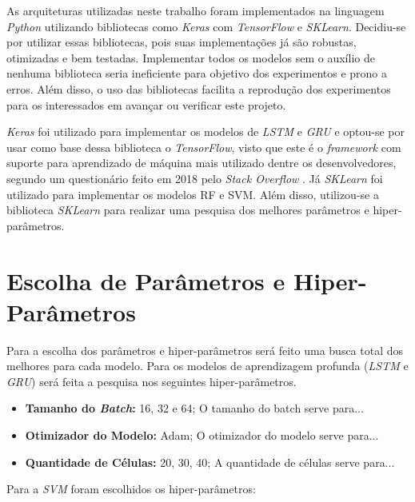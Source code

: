 As arquiteturas utilizadas neste trabalho foram implementados na linguagem \textit{Python} utilizando bibliotecas como \textit{Keras} com \textit{TensorFlow} e \textit{SKLearn}. Decidiu-se por utilizar essas bibliotecas, pois suas implementações já são robustas, otimizadas e bem testadas. Implementar todos os modelos sem o auxílio de nenhuma biblioteca seria ineficiente para objetivo dos experimentos e prono a erros. Além disso, o uso das bibliotecas facilita a reprodução dos experimentos para os interessados em avançar ou verificar este projeto.

\textit{Keras} foi utilizado para implementar os modelos de \textit{\acrshort{LSTM}} e \textit{\acrshort{GRU}} e optou-se por usar como base dessa biblioteca o \textit{TensorFlow}, visto que este é o \textit{framework} com suporte para aprendizado de máquina mais utilizado dentre os desenvolvedores, segundo um questionário feito em 2018 pelo \textit{Stack Overflow} \cite{stack_2018}. Já \textit{SKLearn} foi utilizado para implementar os modelos \acrshort{RF} e \acrshort{SVM}. Além disso, utilizou-se a biblioteca \textit {SKLearn} para realizar uma pesquisa dos melhores parâmetros e hiper-parâmetros.

\section{Escolha de Parâmetros e Hiper-Parâmetros}

Para a escolha dos parâmetros e hiper-parâmetros será feito uma busca total dos melhores para cada modelo. Para os modelos de aprendizagem profunda (\textit{\acrshort{LSTM}} e \textit{\acrshort{GRU}}) será feita a pesquisa nos seguintes hiper-parâmetros.


\begin{itemize}
    \item \textbf{Tamanho do \textit{Batch}:} 16, 32 e 64; \newline
    O tamanho do batch serve para...
    \item \textbf{Otimizador do Modelo:} Adam; \newline
    O otimizador do modelo serve para...
    \item \textbf{Quantidade de Células:} 20, 30, 40; \newline
    A quantidade de células serve para...
\end{itemize}

Para a \textit{\acrshort{SVM}} foram escolhidos os hiper-parâmetros:

